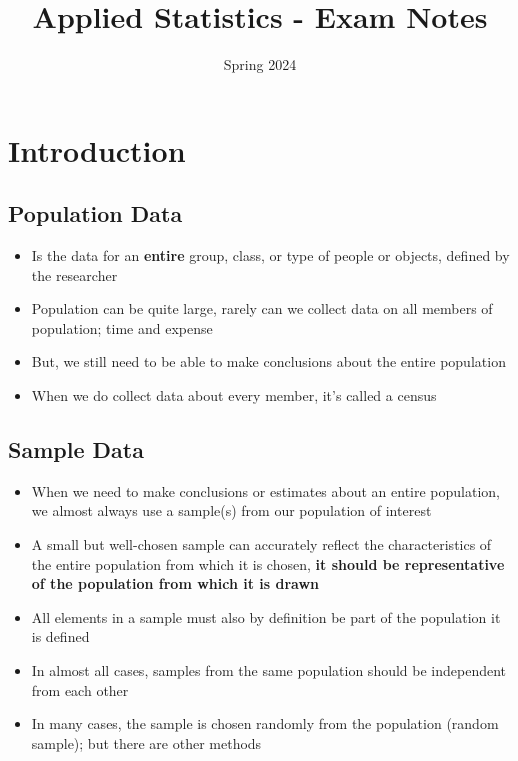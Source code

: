 \documentclass{article}
\title{Applied Statistics - Exam Notes}
\date{Spring 2024}
\begin{document}
\maketitle

\tableofcontents

\pagebreak

\section{Introduction}

\subsection{Population Data}

\begin{itemize}
    \item Is the data for an \textbf{entire} group, class, or type of people or objects, defined by the researcher
    \item Population can be quite large, rarely can we collect data on all members of population; time and expense
    \item But, we still need to be able to make conclusions about the entire population
    \item When we do collect data about every member, it's called a census
\end{itemize}

\subsection{Sample Data}

\begin{itemize}
    \item When we need to make conclusions or estimates about an entire population, we almost always use a sample(s) from our population of interest
    \item A small but well-chosen sample can accurately reflect the characteristics of the entire population from which it is chosen, \textbf{it should be representative of the population from which it is drawn}
    \item All elements in a sample must also by definition be part of the population it is defined
    \item In almost all cases, samples from the same population should be independent from each other
    \item In many cases, the sample is chosen randomly from the population (random sample); but there are other methods
\end{itemize}
\end{document}
